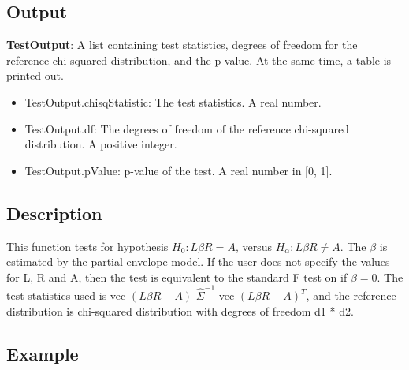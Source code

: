 \documentclass[a4paper,11pt,openany]{memoir}
\begin{document}
\subsection*{Output}

\begin{par}
\textbf{TestOutput}: A list containing test statistics, degrees of freedom for the reference chi-squared distribution, and the p-value.  At the same time, a table is printed out.
\end{par} \vspace{1em}
\begin{itemize}
\setlength{\itemsep}{-1ex}
   \item TestOutput.chisqStatistic: The test statistics. A real number.
   \item TestOutput.df: The degrees of freedom of the reference chi-squared distribution.  A positive integer.
   \item TestOutput.pValue: p-value of the test.  A real number in [0, 1].
\end{itemize}


\subsection*{Description}

\begin{par}
This function tests for hypothesis $H_0: L\beta R = A$, versus $H_\alpha: L\beta R\neq A$.  The $\beta$ is estimated by the partial envelope model.  If the user does not specify the values for L, R and A, then the test is equivalent to the standard F test on if $\beta = 0$.  The test statistics used is vec $(L\beta R - A)$ $\hat{\Sigma}^{-1}$ vec $(L\beta R - A)^{T}$, and the reference distribution is chi-squared distribution with degrees of freedom d1 * d2.
\end{par} \vspace{1em}


\subsection*{Example}
\end{document}
